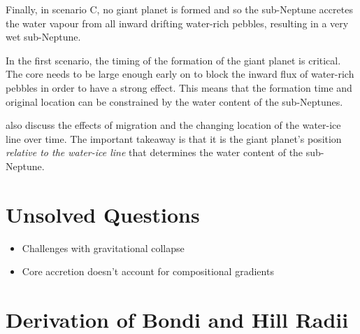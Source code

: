\documentclass[twocolumn]{aastex631}
\begin{document}
Finally, in scenario C, no giant planet is formed and so the sub-Neptune accretes the water vapour from all inward drifting water-rich pebbles, resulting in a very wet sub-Neptune.

In the first scenario, the timing of the formation of the giant planet is critical. The core needs to be large enough early on to block the inward flux of water-rich pebbles in order to have a strong effect. This means that the formation time and original location can be constrained by the water content of the sub-Neptunes.

\citet{Bitsch+2021} also discuss the effects of migration and the changing location of the water-ice line over time. The important takeaway is that it is the giant planet's position \textit{relative to the water-ice line} that determines the water content of the sub-Neptune.

\section{Unsolved Questions}

\begin{itemize}
    \item Challenges with gravitational collapse \citep{Forgan+2013}
    \item Core accretion doesn't account for compositional gradients \citep{D'Angelo+2018}
\end{itemize}



{}

\appendix

\section{Derivation of Bondi and Hill Radii}\label{app:maths}
\end{document}
